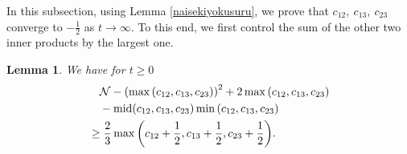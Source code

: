 \documentclass[reqno]{amsart}
\theoremstyle{plain}
\newtheorem{lemma}[theorem]{Lemma}
\theoremstyle{definition}
\numberwithin{equation}{section}
\newcommand{\m}{\mbox{\textnormal{mid}}}
\newcommand{\1}{\mathbbm{1}}
\begin{document}
In this subsection, using Lemma \ref{naisekiyokusuru}, we prove that $c_{12},\ c_{13},\ c_{23}$ converge to $-\frac{1}{2}$ as $t\to\infty$. To this end, we first control the sum of the other two inner products by the largest one.
\begin{lemma}\label{naisekiest127}
We have for $t\geq 0$
\begin{align}\label{naisekies127}
\begin{aligned}
&\quad \mathcal{N}-\left(\max{(c_{12},c_{13},c_{23})}\right)^2+2\max{(c_{12},c_{13},c_{23})}
\\
&\quad-\m{(c_{12},c_{13},c_{23})}\min{(c_{12},c_{13},c_{23})}
\\
&\geq \frac{2}{3}\max{\left(c_{12}+\frac{1}{2},c_{13}+\frac{1}{2},c_{23}+\frac{1}{2}\right)}.
\end{aligned}
\end{align}
\end{lemma}
\end{document}
